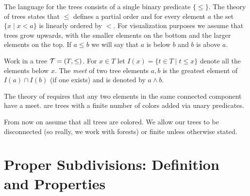 The language for the trees consists of a single binary predicate $\{\leq\}$. The theory of trees states that $\leq$ defines a partial order and for every element $a$ the set $\{x \mid x < a\}$ is linearly ordered by $<$. For visualization purposes we assume that trees grow upwards, with the smaller elements on the bottom and the larger elements on the top. If $a \leq b$ we will say that $a$ is below $b$ and $b$ is above $a$.

\begin{Definition}
  Work in a tree $\operatorname{\mathcal T} = (T, \leq)$.
  For $x \in T$ let $I(x) = \{t \in T \mid t \leq x\}$ denote all the elements below $x$.
  The \emph{meet} of two tree elements $a,b$ is the greatest element of $I(a) \cap I(b)$ (if one exists) and is denoted by $a \wedge b$.
\end{Definition}

The theory of  requires that any two elements in the same connected component have a meet.  are trees with a finite number of colors added via unary predicates.

From now on assume that all trees are colored.
We allow our trees to be disconnected (so really, we work with forests) or finite unless otherwise stated.

\section{Proper Subdivisions: Definition and Properties}

